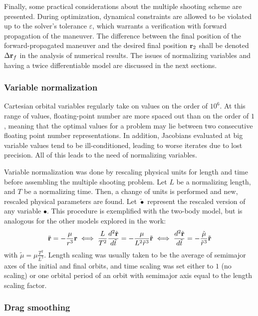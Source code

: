 Finally, some practical considerations about the multiple shooting scheme are presented. During optimization, dynamical constraints are allowed to be violated up to the solver's tolerance \(\varepsilon\), which warrants a verification with forward propagation of the maneuver. The difference between the final position of the forward-propagated maneuver and the desired final position \(\mathbf{r}_2\) shall be denoted \(\Delta \mathbf{r}_f\) in the analysis of numerical results. The issues of normalizing variables and having a twice differentiable model are discussed in the next sections.

\subsubsection{Variable normalization}

Cartesian orbital variables regularly take on values on the order of \(10^6\). At this range of values, floating-point number are more spaced out than on the order of \(1\), meaning that the optimal values for a problem may lie between two consecutive floating point number representations. In addition, Jacobians evaluated at big variable values tend to be ill-conditioned, leading to worse iterates due to lost precision. All of this leads to the need of normalizing variables.

Variable normalization was done by rescaling physical units for length and time before assembling the multiple shooting problem. Let \(L\) be a normalizing length, and \(T\) be a normalizing time. Then, a change of units is performed and new, rescaled physical parameters are found. Let \(\tilde{\bullet}\) represent the rescaled version of any variable \(\bullet\). This procedure is exemplified with the two-body model, but is analogous for the other models explored in the work:
\begin{equation}
    \ddot{\mathbf{r}} = -\frac{\mu}{r^3} \mathbf{r} \iff \frac{L}{T^2}\frac{d^2 \tilde{\mathbf{r}}}{d \tilde{t}} = -\frac{\mu}{L^2 \tilde{r}^3} \tilde{\mathbf{r}} \iff \frac{d^2 \tilde{\mathbf{r}}}{d \tilde{t}} = -\frac{\tilde{\mu}}{\tilde{r}^3} \tilde{\mathbf{r}}
\end{equation}
with \(\tilde{\mu} = \mu \frac{T^2}{L^3}\). Length scaling was usually taken to be the average of semimajor axes of the initial and final orbits, and time scaling was set either to \(1\) (no scaling) or one orbital period of an orbit with semimajor axis equal to the length scaling factor.

\subsubsection{Drag smoothing}

